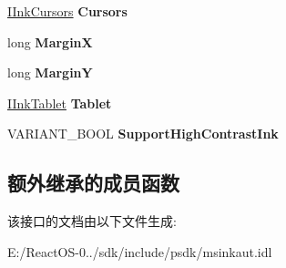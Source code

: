 \begin{DoxyCompactItemize}
\hyperlink{interface_m_s_i_n_k_a_u_t_lib_1_1_i_ink_cursors}{I\+Ink\+Cursors} {\bfseries Cursors}
\item 
\mbox{\label{interface_m_s_i_n_k_a_u_t_lib_1_1_i_ink_collector_a281f67a77067658b88d85fa19a71ca17}} 
long {\bfseries MarginX}
\item 
\mbox{\label{interface_m_s_i_n_k_a_u_t_lib_1_1_i_ink_collector_a214cea257f7920a4bc52a497c9670a0a}} 
long {\bfseries MarginY}
\item 
\mbox{\label{interface_m_s_i_n_k_a_u_t_lib_1_1_i_ink_collector_ab675ddef17d2a6d6070139897e611283}} 
\hyperlink{interface_m_s_i_n_k_a_u_t_lib_1_1_i_ink_tablet}{I\+Ink\+Tablet} {\bfseries Tablet}
\item 
\mbox{\label{interface_m_s_i_n_k_a_u_t_lib_1_1_i_ink_collector_a4fd96f16f023a0e4f764e54ef9c42fbc}} 
V\+A\+R\+I\+A\+N\+T\+\_\+\+B\+O\+OL {\bfseries Support\+High\+Contrast\+Ink}
\end{DoxyCompactItemize}
\subsection*{额外继承的成员函数}


该接口的文档由以下文件生成\+:\begin{DoxyCompactItemize}
\item 
E\+:/\+React\+O\+S-\/0../sdk/include/psdk/msinkaut.\+idl\end{DoxyCompactItemize}
